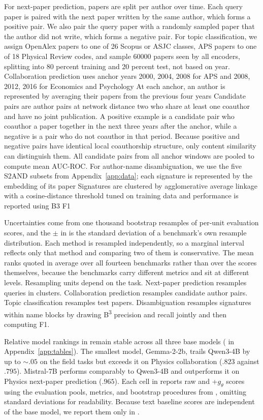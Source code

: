 For next-paper prediction, papers are split per author over time.
Each query paper is paired with the next paper written by the same author, which forms a positive pair. 
We also pair the query paper with a randomly sampled paper that the author did not write, which forms a negative pair.
For topic classification, we assign OpenAlex papers to one of 26 Scopus or ASJC classes, APS papers to one of 18 Physical Review codes, and sample 60000 papers seen by all encoders, splitting into 80 percent training and 20 percent test, not based on year.
Collaboration prediction uses anchor years 2000, 2004, 2008 for APS and 2008, 2012, 2016 for Economics and Psychology
At each anchor, an author is represented by averaging their papers from the previous four years
Candidate pairs are author pairs at network distance two who share at least one coauthor and have no joint publication.
A positive example is a candidate pair who coauthor a paper together in the next three years after the anchor, while a negative is a pair who do not coauthor in that period.
Because positive and negative pairs have identical local coauthorship structure, only content similarity can distinguish them.
All candidate pairs from all anchor windows are pooled to compute mean AUC-ROC.
For author-name disambiguation, we use the five S2AND subsets from Appendix~\ref{app:data}; each signature is represented by the embedding of its paper
Signatures are clustered by agglomerative average linkage with a cosine-distance threshold tuned on training data and performance is reported using B3 F1

Uncertainties come from one thousand bootstrap resamples of per-unit evaluation scores, and the $\pm$ in  is the standard deviation of a benchmark's own resample distribution. Each method is resampled independently, so a marginal interval reflects only that method and comparing two of them is conservative. The mean ranks quoted in  average over all fourteen benchmarks rather than over the scores themselves, because the benchmarks carry different metrics and sit at different levels. Resampling units depend on the task. Next-paper prediction resamples queries in clusters. Collaboration prediction resamples candidate author pairs. Topic classification resamples test papers. Disambiguation resamples signatures within name blocks by drawing B\textsuperscript{3} precision and recall jointly and then computing F1.

Relative model rankings in  remain stable across all three base models ( in Appendix~\ref{app:tables}).
The smallest model, Gemma-2-2b, trails Qwen3-4B by up to ${\sim}.05$ on the field tasks but exceeds it on Physics collaboration ($.823$ against $.795$).
Mistral-7B performs comparably to Qwen3-4B and outperforms it on Physics next-paper prediction ($.965$).
Each cell in  reports raw and +$g_\theta$ scores using the evaluation pools, metrics, and bootstrap procedures from , omitting standard deviations for readability.
Because text baseline scores are independent of the base model, we report them only in .
